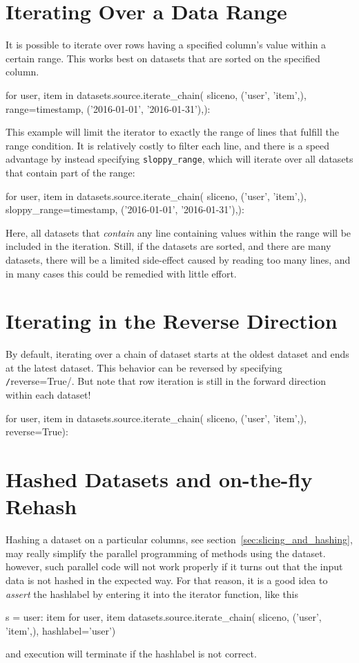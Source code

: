 \section{Iterating Over a Data Range}
\label{sec:iterate_sloppy_range}
It is possible to iterate over rows having a specified column's value
within a certain range.  This works best on datasets that are sorted
on the specified column.
\begin{python}
for user, item in datasets.source.iterate_chain(
    sliceno, ('user', 'item',),
    range={timestamp, ('2016-01-01', '2016-01-31'),}):
\end{python}
This example will limit the iterator to exactly the range of lines
that fulfill the range condition.  It is relatively costly to filter
each line, and there is a speed advantage by instead specifying
\texttt{sloppy\_range}, which will iterate over all datasets that
contain part of the range:
\begin{python}
for user, item in datasets.source.iterate_chain(
    sliceno, ('user', 'item',),
    sloppy_range={timestamp, ('2016-01-01', '2016-01-31'),}):
\end{python}
Here, all datasets that \textsl{contain} any line containing values
within the range will be included in the iteration.  Still, if the
datasets are sorted, and there are many datasets, there will be a
limited side-effect caused by reading too many lines, and in many
cases this could be remedied with little effort.



\section{Iterating in the Reverse Direction}
By default, iterating over a chain of dataset starts at the oldest
dataset and ends at the latest dataset.  This behavior can be
reversed by specifying \texttt/reverse=True/.  But note
that row iteration is still in the forward direction within each
dataset!
\begin{python}
for user, item in datasets.source.iterate_chain(
    sliceno, ('user', 'item',),
    reverse=True):
\end{python}



\section{Hashed Datasets and on-the-fly Rehash}
Hashing a dataset on a particular columns, see
section~\ref{sec:slicing_and_hashing}, may really simplify the
parallel programming of methods using the dataset.  however, such
parallel code will not work properly if it turns out that the input
data is not hashed in the expected way.  For that reason, it is a
good idea to \emph{assert} the hashlabel by entering it into the
iterator function, like this
\begin{python}
s = {user: item for user, item datasets.source.iterate_chain(
     sliceno, ('user', 'item',), hashlabel='user')}
\end{python}
and execution will terminate if the hashlabel is not correct.

